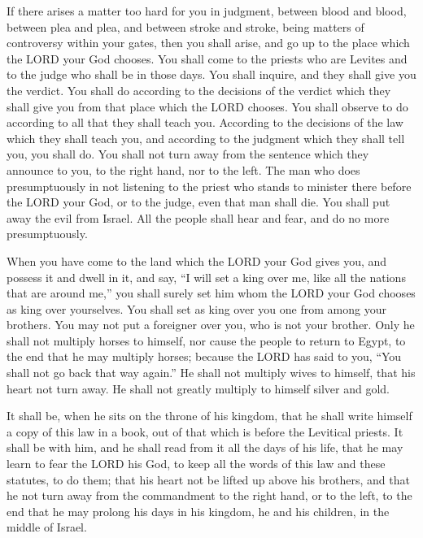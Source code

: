 \myverse{}If there arises a matter too hard for you in judgment, between
blood and blood, between plea and plea, and between stroke and stroke, being matters of controversy within
your gates, then you shall arise, and go up to the place which the LORD your God chooses.
\myverse{}You shall come to the priests who are Levites and to the judge who shall be
in those days. You shall inquire, and they shall give you the verdict.
\myverse{}You shall do according to the decisions of the verdict which they shall give
you from that place which the LORD chooses. You shall observe to do according to all that they shall teach
you.
\myverse{}According to the decisions of the law which they shall teach you, and according
to the judgment which they shall tell you, you shall do. You shall not turn away from the sentence which
they announce to you, to the right hand, nor to the left.
\myverse{}The man who does presumptuously in not listening to the priest who stands
to minister there before the LORD your God, or to the judge, even that man shall die. You shall put away
the evil from Israel.
\myverse{}All the people shall hear and fear, and do no more presumptuously.


\myverse{}When you have come to the land which the LORD your God gives
you, and possess it and dwell in it, and say, “I will set a king over me, like all the nations that are
around me,”
\myverse{}you shall surely set him whom the LORD your God chooses as king over yourselves.
You shall set as king over you one from among your brothers. You may not put a foreigner over you, who
is not your brother.
\myverse{}Only he shall not multiply horses to himself, nor cause the people to return
to Egypt, to the end that he may multiply horses; because the LORD has said to you, “You shall not go
back that way again.”
\myverse{}He shall not multiply wives to himself, that his heart not turn away. He
shall not greatly multiply to himself silver and gold.


\myverse{}It shall be, when he sits on the throne of his kingdom, that
he shall write himself a copy of this law in a book, out of that which is before the Levitical priests.
\myverse{}It shall be with him, and he shall read from it all the days of his life,
that he may learn to fear the LORD his God, to keep all the words of this law and these statutes, to do
them;
\myverse{}that his heart not be lifted up above his brothers, and that he not turn
away from the commandment to the right hand, or to the left, to the end that he may prolong his days in
his kingdom, he and his children, in the middle of Israel.


